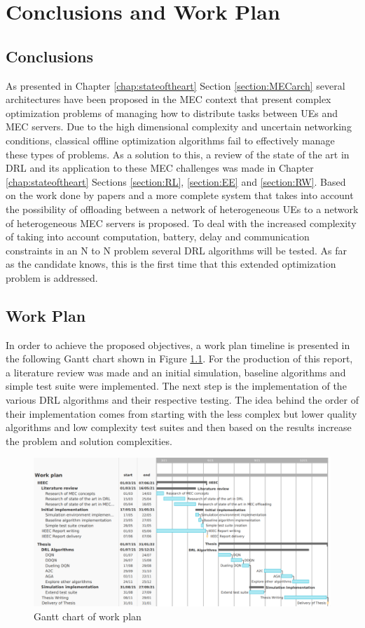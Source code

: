 \chapter{Conclusions and Work Plan}
\section{Conclusions}
\noindent As presented in Chapter \ref{chap:stateoftheart} Section \ref{section:MECarch} several architectures have been proposed in the \acrshort{MEC} context that present complex optimization problems of managing how to distribute tasks between \acrshort{UE}s and \acrshort{MEC} servers. Due to the high dimensional complexity and uncertain networking conditions, classical offline optimization algorithms fail to effectively manage these types of problems. As a solution to this, a review of the state of the art in \acrshort{DRL} and its application to these \acrshort{MEC} challenges was made in Chapter \ref{chap:stateoftheart} Sections \ref{section:RL}, \ref{section:EE} and \ref{section:RW}. Based on the work done by papers \cite{NUE1mec} and \cite{taskclass1} a more complete system that takes into account the possibility of offloading between a network of heterogeneous \acrshort{UE}s to a network of heterogeneous \acrshort{MEC} servers is proposed. To deal with the increased complexity of taking into account computation, battery, delay and communication constraints in an N to N problem several \acrshort{DRL} algorithms will be tested. As far as the candidate knows, this is the first time that this extended optimization problem is addressed.

\clearpage
\section{Work Plan}
\noindent In order to achieve the proposed objectives, a work plan timeline is presented in the following Gantt chart shown in Figure \ref{ganttchart}. For the production of this report, a literature review was made and an initial simulation, baseline algorithms and simple test suite were implemented. The next step is the implementation of the various \acrshort{DRL} algorithms and their respective testing. The idea behind the order of their implementation comes from starting with the less complex but lower quality algorithms and low complexity test suites and then based on the results increase the problem and solution complexities.

\begin{figure}[h]
  \centering
  \includegraphics[width=\textwidth]{images/workPlan.png}
  \caption{Gantt chart of work plan} \label{ganttchart}
\end{figure}